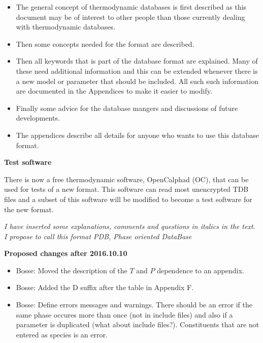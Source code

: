 \documentclass[12pt]{article}
\begin{document}
\begin{itemize}
\item The general concept of thermodynamic databases is first
  described as this document may be of interest to other people than
  those currently dealing with thermodynamic databases.

\item Then some concepts needed for the format are described.

\item Then all keywords that is part of the database format are
  explained.  Many of these need additional information and this can
  be extended whenever there is a new model or parameter that should
  be included.  All such such information are documented in the
  Appendices to make it easier to modify.

\item Finally some advice for the database mangers and discussions of
  future developments.

\item The appendices describe all details for anyone who wants to use
  this database format.
\end{itemize}

\bigskip

{\bf Test software}

\bigskip

There is now a free thermodynamic software, OpenCalphad (OC), that can
be used for tests of a new format.  This software can read most
unencrypted TDB files and a subset of this software will be modified
to become a test software for the new format.

\vspace{10mm}

{\em I have inserted some explanations, comments and questions in
  italics in the text.  I propose to call this format PDB, Phase
  oriented DataBase}

\newpage

{\Large \bf Proposed changes after 2016.10.10}
\begin{itemize}
\item Bosse: Moved the description of the $T$ and $P$ dependence to an
  appendix.
\item Bosse: Added the D suffix after the table in Appendix F.
\item Bosse: Define errors messages and warnings.  There should be an
  error if the same phase occures more than once (not in include
  files) and also if a parameter is duplicated (what about include
  files?).  Constituents that are not entered as species is an error.
\end{itemize}
\end{document}
